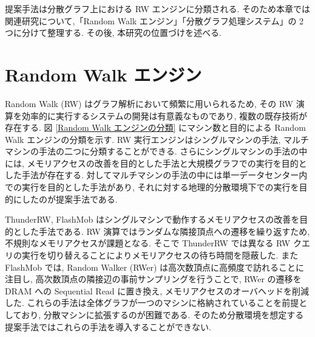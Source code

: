 
提案手法は分散グラフ上における RW エンジンに分類される. そのため本章では関連研究について,「Random Walk エンジン」「分散グラフ処理システム」の 2 つに分けて整理する. その後, 本研究の位置づけを述べる. 

\section{Random Walk エンジン}\label{sec:Random Walk エンジン}

Random Walk (RW) はグラフ解析において頻繁に用いられるため, その RW 演算を効率的に実行するシステムの開発は有意義なものであり, 複数の既存技術が存在する. 図 \ref{Random Walk エンジンの分類} にマシン数と目的による Random Walk エンジンの分類を示す. RW 実行エンジンはシングルマシンの手法, マルチマシンの手法の二つに分類することができる. さらにシングルマシンの手法の中には, メモリアクセスの改善を目的とした手法と大規模グラフでの実行を目的とした手法が存在する. 対してマルチマシンの手法の中には単一データセンター内での実行を目的とした手法があり, それに対する地理的分散環境下での実行を目的にしたのが提案手法である. 

ThunderRW\cite{10.14778/3476249.3476257}, FlashMob\cite{10.1145/3477132.3483575} はシングルマシンで動作するメモリアクセスの改善を目的とした手法である. RW 演算ではランダムな隣接頂点への遷移を繰り返すため, 不規則なメモリアクセスが課題となる. そこで ThunderRW では異なる RW クエリの実行を切り替えることによりメモリアクセスの待ち時間を隠蔽した. また FlashMob では, Random Walker (RWer) は高次数頂点に高頻度で訪れることに注目し, 高次数頂点の隣接辺の事前サンプリングを行うことで, RWer の遷移を DRAM への Sequential Read に置き換え, メモリアクセスのオーバヘッドを削減した. これらの手法は全体グラフが一つのマシンに格納されていることを前提としており, 分散マシンに拡張するのが困難である. そのため分散環境を想定する提案手法ではこれらの手法を導入することができない.  

